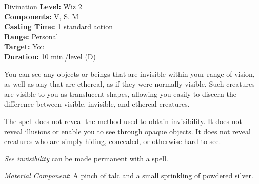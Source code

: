 {Divination}
{
	\textbf{Level:}
	Wiz 2\\
	\textbf{Components:}
	V, S, M\\
	\textbf{Casting Time:}
	1 standard action\\
	\textbf{Range:}
	Personal\\
	\textbf{Target:}
	You\\
	\textbf{Duration:}
	10 min./level (D)\\
}
{
	You can see any objects or beings that are invisible within your range of vision, as well as any that are ethereal, as if they were normally visible. Such creatures are visible to you as translucent shapes, allowing you easily to discern the difference between visible, invisible, and ethereal creatures.

	The spell does not reveal the method used to obtain invisibility. It does not reveal illusions or enable you to see through opaque objects. It does not reveal creatures who are simply hiding, concealed, or otherwise hard to see.

	\emph{See invisibility} can be made permanent with a  spell.

	\textit{Material Component}:
	A pinch of talc and a small sprinkling of powdered silver.

}
